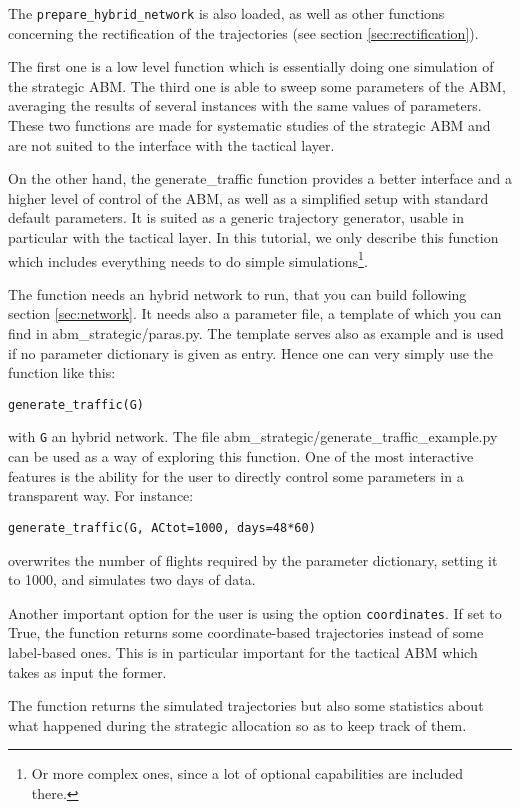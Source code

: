 \documentclass[12pt]{article}
\begin{document}
The \verb|prepare_hybrid_network| is also loaded, as well as other functions concerning the rectification of the trajectories (see section \ref{sec:rectification}).

The first one is a low level function which is essentially doing one simulation of the strategic ABM. The third one is able to sweep some parameters of the ABM, averaging the results of several instances with the same values of parameters. These two functions are made for systematic studies of the strategic ABM and are not suited to the interface with the tactical layer.

On the other hand, the generate\_traffic function provides a better interface and a higher level of control of the ABM, as well as a simplified setup with standard default parameters. It is suited as a generic trajectory generator, usable in particular with the tactical layer. In this tutorial, we only describe this function which includes everything needs to do simple simulations\footnote{Or more complex ones, since a lot of optional capabilities are included there.}.

The function needs an hybrid network to run, that you can build following section \ref{sec:network}. It needs also a parameter file, a template of which you can find in abm\_strategic/paras.py. The template serves also as example and is used if no parameter dictionary is given as entry. Hence one can very simply use the function like this:
\begin{verbatim}
generate_traffic(G)
\end{verbatim}
with \verb|G| an hybrid network. The file abm\_strategic/generate\_traffic\_example.py can be used as a way of exploring this function. One of the most interactive features is the ability for the user to directly control some parameters in a transparent way. For instance:
\begin{verbatim}
generate_traffic(G, ACtot=1000, days=48*60)
\end{verbatim}
overwrites the number of flights required by the parameter dictionary, setting it to 1000, and simulates two days of data.

Another important option for the user is using the option \verb|coordinates|. If set to True, the function returns some coordinate-based trajectories instead of some label-based ones. This is in particular important for the tactical ABM which takes as input the former.

The function returns the simulated trajectories but also some statistics about what happened during the strategic allocation so as to keep track of them.
\end{document}
